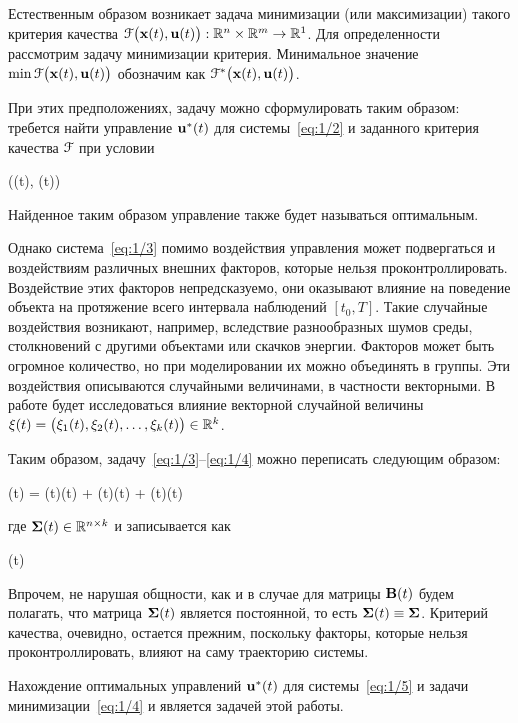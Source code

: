 Естественным образом возникает задача минимизации (или максимизации) такого критерия качества $\mathcal{F}\bigl(\mathbf{x}(t), \mathbf{u}(t)\bigr): \mathbb{R}^{n} \times \mathbb{R}^{m} \to \mathbb{R}^{1}$. Для определенности рассмотрим задачу минимизации критерия. Минимальное значение $\min\mathcal{F}\bigl(\mathbf{x}(t), \mathbf{u}(t)\bigr)$ обозначим как $\mathcal{F}^{*}\bigl(\mathbf{x}(t), \mathbf{u}(t)\bigr)$.

При этих предположениях, задачу можно сформулировать таким образом: требется найти управление $\mathbf{u}^{*}(t)$ для системы~\ref{eq:1/2} и заданного критерия качества $\mathcal{F}$ при условии

    \funcF\bigl((t), (t)\bigr) \to \min {}
\eeq

Найденное таким образом управление также будет называться оптимальным.

\br

Однако система~\ref{eq:1/3} помимо воздействия управления может подвергаться и воздействиям различных внешних факторов, которые нельзя проконтроллировать. Воздействие этих факторов непредсказуемо, они оказывают влияние на поведение объекта на протяжение всего интервала наблюдений $[t_0, T]$. Такие случайные воздействия возникают, например, вследствие разнообразных шумов среды, столкновений с другими объектами или скачков энергии. Факторов может быть огромное количество, но при моделировании их можно объединять в группы. Эти воздействия описываются случайными величинами, в частности векторными. В работе будет исследоваться влияние векторной случайной величины $\mathbf{\xi}(t) = \bigl( \xi_1(t), \xi_2(t), \ldots, \xi_k(t) \bigr) \in \mathbb{R}^{k}$.

Таким образом, задачу~\ref{eq:1/3}--\ref{eq:1/4} можно переписать следующим образом:

    (t) = (t)(t) + (t)(t) + \m{\Sigma}(t)\m{\xi}(t) \text{,}
\eeq

где $\mathbf{\Sigma}(t) \in \mathbb{R}^{{n} \times {k}}$ и записывается как

\beqn
    \m{\Sigma}(t) \eqdef {} 
\eeqn

Впрочем, не нарушая общности, как и в случае для матрицы $\mathbf{B}(t)$ будем полагать, что матрица $\mathbf{\Sigma}(t)$ является постоянной, то есть $\mathbf{\Sigma}(t) \equiv \mathbf{\Sigma}$. Критерий качества, очевидно, остается прежним, поскольку факторы, которые нельзя проконтроллировать, влияют на саму траекторию системы.

Нахождение оптимальных управлений $\mathbf{u}^{*}(t)$ для системы~\ref{eq:1/5} и задачи минимизации~\ref{eq:1/4} и является задачей этой работы.